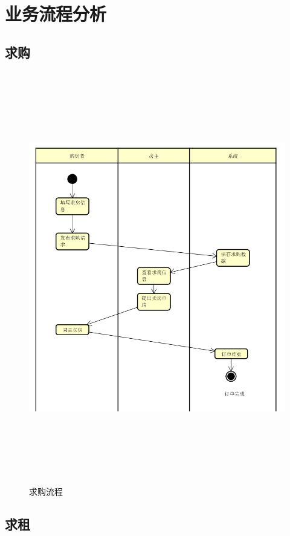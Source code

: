 
\chapter{业务流程分析}

\section{求购}

\begin{figure}[htbp]

    \centering
    
    \includegraphics[height=18.0cm,width=14.0cm]{requirement/figures/qiugou.png}
    
    \caption{求购流程}
    
    \end{figure}
\newpage
\section{求租}

